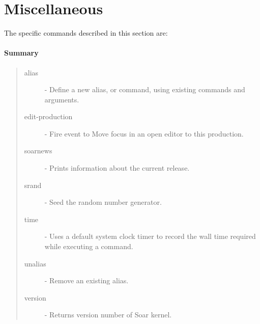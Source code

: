 


\section{Miscellaneous}
\label{MISC}



The specific commands described in this section are:


\paragraph{Summary}
\begin{quote}
\begin{description}
\item[alias] - Define a new alias, or command, using existing commands and arguments. 
\item[edit-production] - Fire event to Move focus in an open editor to this production.
\item[soarnews] - Prints information about the current release.
\item[srand] -  Seed the random number generator.
\item[time] - Uses a default system clock timer to record the wall time required while executing a command.
\item[unalias] - Remove an existing alias.
\item[version] - Returns version number of Soar kernel.
\end{description}
\end{quote}










